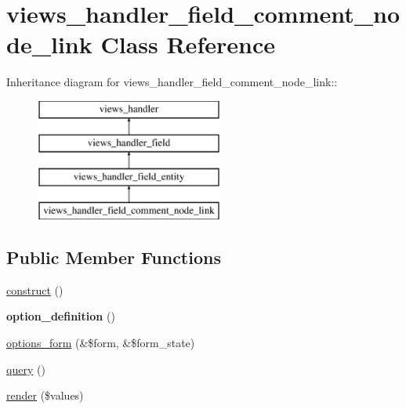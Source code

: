 \hypertarget{classviews__handler__field__comment__node__link}{
\section{views\_\-handler\_\-field\_\-comment\_\-node\_\-link Class Reference}
\label{classviews__handler__field__comment__node__link}
}
Inheritance diagram for views\_\-handler\_\-field\_\-comment\_\-node\_\-link::\begin{figure}[H]
\begin{center}
\leavevmode
\includegraphics[height=4cm]{classviews__handler__field__comment__node__link}
\end{center}
\end{figure}
\subsection*{Public Member Functions}
\begin{DoxyCompactItemize}
\item 
\hyperlink{classviews__handler__field__comment__node__link_a6a8823310c2ef5c3a70e6a394e45e699}{construct} ()
\item 
\hypertarget{classviews__handler__field__comment__node__link_ab4da7290cf0b97776fcc70c4f799e567}{
{\bfseries option\_\-definition} ()}
\label{classviews__handler__field__comment__node__link_ab4da7290cf0b97776fcc70c4f799e567}

\item 
\hyperlink{classviews__handler__field__comment__node__link_a4a4be3287da8267b5571d1fe404f9070}{options\_\-form} (\&\$form, \&\$form\_\-state)
\item 
\hyperlink{classviews__handler__field__comment__node__link_af48614fab00f4f6b8ec7e68a3d352b20}{query} ()
\item 
\hyperlink{classviews__handler__field__comment__node__link_a57a6cd4b57779b44220bc89f48c86ee6}{render} (\$values)
\end{DoxyCompactItemize}


